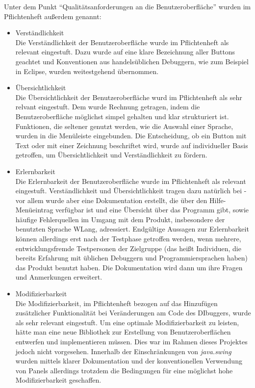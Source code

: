 \documentclass[parskip=full]{scrartcl}
\begin{document}
				Unter dem Punkt \enquote{Qualitätsanforderungen an die Benutzeroberfläche} wurden im Pflichtenheft außerdem genannt:
				\begin{itemize}
				\item Verständlichkeit \\ 
				Die Verständlichkeit der Benutzeroberfläche wurde im Pflichtenheft als relevant eingestuft. Dazu wurde auf eine klare Bezeichnung aller Buttons geachtet und Konventionen aus handelsüblichen Debuggern, wie zum Beispiel in Eclipse, wurden weitestgehend übernommen. 
				\item Übersichtlichkeit \\
				Die Übersichtlichkeit der Benutzeroberfläche wurd im Pflichtenheft als sehr relvant eingestuft. Dem wurde Rechnung getragen, indem die Benutzeroberfläche möglichst simpel gehalten und klar strukturiert ist. Funktionen, die seltener genutzt werden, wie die Auswahl einer Sprache, wurden in die Menüleiste eingebunden. Die Entscheidung, ob ein Button mit Text oder mit einer Zeichnung beschriftet wird, wurde auf individueller Basis getroffen, um Übersichtlichkeit und Verständlichkeit zu fördern.
				\item Erlernbarkeit \\
				Die Erlernbarkeit der Benutzeroberfläche wurde im Pflichtenheft als relevant eingestuft. Verständlichkeit und Übersichtlichkeit tragen dazu natürlich bei - vor allem wurde aber eine Dokumentation erstellt, die über den Hilfe-Menüeintrag verfügbar ist und eine Übersicht über das Programm gibt, sowie häufige Fehlerquellen im Umgang mit dem Produkt, insbesondere der benutzten Sprache WLang, adressiert. Endgültige Aussagen zur Erlernbarkeit können allerdings erst nach der Testphase getroffen werden, wenn mehrere, entwicklungsfremde Testpersonen der Zielgruppe (das heißt Individuen, die bereits Erfahrung mit üblichen Debuggern und Programmiersprachen haben) das Produkt benutzt haben. Die Dokumentation wird dann um ihre Fragen und Anmerkungen erweitert.
				\item Modifizierbarkeit \\
				Die Modifizierbarkeit, im Pflichtenheft bezogen auf das Hinzufügen zusätzlicher Funktionalität bei Veränderungen am Code des DIbuggers, wurde als sehr relevant eingestuft. Um eine optimale Modifizierbarkeit zu leisten, hätte man eine neue Bibliothek zur Erstellung von Benutzeroberflächen entwerfen und implementieren müssen. Dies war im Rahmen dieses Projektes jedoch nicht vorgesehen. Innerhalb der Einschränkungen von \textit{java.swing} wurden mittels klarer Dokumentation und der konventionellen Verwendung von Panels allerdings trotzdem die Bedingungen für eine möglichst hohe Modifizierbarkeit geschaffen.
				
				\end{itemize}
		
\end{document}
